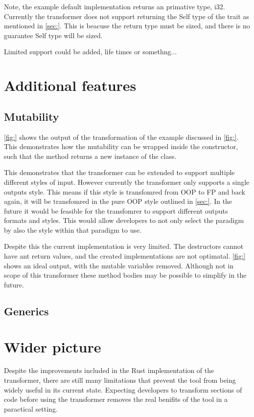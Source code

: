 \documentclass[ oneside,%
                    author={James Elgar},
                    degree={MEng},
                     title={Bidirectional transformer between functional and \\ object-oriented programming in Rust},
                  subtitle={}]{dissertation}
\begin{document}
Note, the example default implementation returns an primative type, i32. Currently the transformer does not support returning the Self type of the trait as mentioned in \autoref{sec:}. This is beacuse the return type must be sized, and there is no guarantee Self type will be sized. 

Limited support could be added, life times or somethng...

\section{Additional features} 

\subsection{Mutability}

\autoref{fig:} shows the output of the transformation of the example discussed in \autoref{fig:}. This demonstrates how the mutability can be wrapped inside the constructor, such that the method returns a new instance of the class.

This demonstrates that the transformer can be extended to support multiple different styles of input. However currently the transformer only supports a single outputs style. This means if this style is transfomred from OOP to FP and back again, it will be transfomred in the pure OOP style outlined in \autoref{sec:}.
In the future it would be feasible for the transfomrer to support different outputs formats and styles. This would allow developers to not only select the paradigm by also the style within that paradigm to use.

Despite this the current implementation is very limited. The destructors cannot have ant return values, and the created implementations are not optimatal. \autoref{fig:} shows an ideal output, with the mutable variables removed. Although not in scope of this transformer these method bodies may be possible to simplify in the future.

\subsection{Generics}

\section{Wider picture}

Despite the improvements included in the Rust implementation of the transformer, there are still many limitations that prevent the tool from being widely useful in its current state. Expecting developers to transform sections of code before using the transformer removes the real benifits of the tool in a paractical setting.
\end{document}
